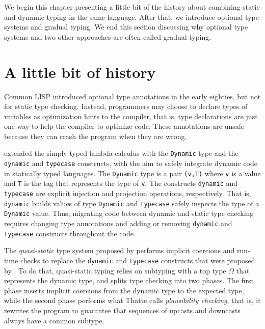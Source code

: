 We begin this chapter presenting a little bit of the history about
combining static and dynamic typing in the same language.
After that, we introduce optional type systems and gradual typing.
We end this section discussing why optional type systems and two
other approaches are often called gradual typing.

\section{A little bit of history}

Common LISP \citep{steele1982ocl} introduced optional type annotations
in the early eighties, but not for static type checking.
Instead, programmers may choose to declare types of variables as
optimization hints to the compiler, that is, type declarations are
just one way to help the compiler to optimize code.
These annotations are unsafe because they can crash the program
when they are wrong.

\citet{abadi1989dts} extended the simply typed lambda calculus with the
\texttt{Dynamic} type and the \texttt{dynamic} and \texttt{typecase}
constructs, with the aim to safely integrate dynamic code in
statically typed languages.
The \texttt{Dynamic} type is a pair \texttt{(v,T)} where \texttt{v} is a
value and \texttt{T} is the tag that represents the type of \texttt{v}.
The constructs \texttt{dynamic} and \texttt{typecase} are explicit
injection and projection operations, respectively.
That is, \texttt{dynamic} builds values of type \texttt{Dynamic} and
\texttt{typecase} safely inspects the type of a \texttt{Dynamic} value.
Thus, migrating code between dynamic and static type checking requires
changing type annotations and adding or removing \texttt{dynamic} and
\texttt{typecase} constructs throughout the code.

The \emph{quasi-static} type system proposed by \citet{thatte1990qst}
performs implicit coercions and run-time checks to replace the
\texttt{dynamic} and \texttt{typecase} constructs that were proposed by
\citet{abadi1989dts}.
To do that, quasi-static typing relies on subtyping with a top type
$\Omega$ that represents the dynamic type, and splits type checking
into two phases.
The first phase inserts implicit coercions from the dynamic type to
the expected type, while the second phase performs what Thatte calls
\emph{plausibility checking}, that is, it rewrites the program to
guarantee that sequences of upcasts and downcasts always have a
common subtype.

